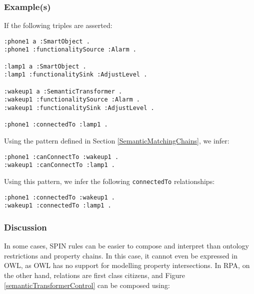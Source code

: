 \subsubsection{Example(s)}

If the following triples are asserted:

\begin{verbatim}
:phone1 a :SmartObject .
:phone1 :functionalitySource :Alarm .

:lamp1 a :SmartObject .
:lamp1 :functionalitySink :AdjustLevel .

:wakeup1 a :SemanticTransformer .
:wakeup1 :functionalitySource :Alarm .
:wakeup1 :functionalitySink :AdjustLevel .

:phone1 :connectedTo :lamp1 .
\end{verbatim}

Using the pattern defined in Section \ref{SemanticMatchingChains}, we infer:

\begin{verbatim}
:phone1 :canConnectTo :wakeup1 .
:wakeup1 :canConnectTo :lamp1 .
\end{verbatim}

Using this pattern, we infer the following \texttt{connectedTo} relationships:

\begin{verbatim}
:phone1 :connectedTo :wakeup1 .
:wakeup1 :connectedTo :lamp1 .
\end{verbatim}

\subsubsection{Discussion}

% 
In some cases, \ac{SPIN} rules can be easier to compose and interpret than ontology restrictions and property chains. In this case, it cannot even be expressed in \ac{OWL}, as \ac{OWL} has no support for modelling property intersections. In \ac{RPA}, on the other hand, relations are first class citizens, and Figure \ref{semanticTransformerControl} can be composed using:\\

